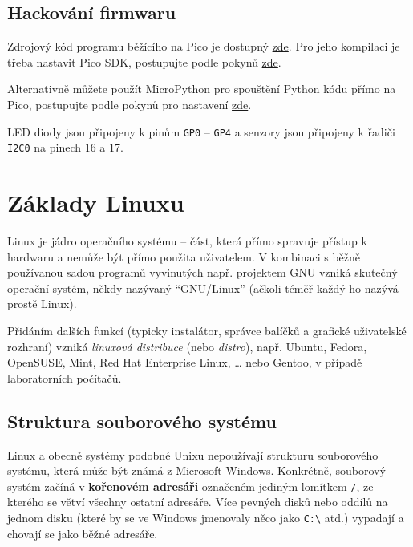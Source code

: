 \subsection{Hackování firmwaru}
Zdrojový kód programu běžícího na Pico je dostupný \href{https://bitbucket.org/emil_varga/picolab/src/master/}{zde}. Pro jeho kompilaci je třeba nastavit Pico SDK, postupujte podle pokynů \href{https://www.raspberrypi.com/documentation/microcontrollers/c_sdk.html}{zde}.

Alternativně můžete použít MicroPython pro spouštění Python kódu přímo na Pico, postupujte podle pokynů pro nastavení \href{https://www.raspberrypi.com/documentation/microcontrollers/micropython.html#what-is-micropython}{zde}.

LED diody jsou připojeny k pinům \verb|GP0| -- \verb|GP4| a senzory jsou připojeny k řadiči \verb|I2C0| na pinech 16 a 17.


\section{Základy Linuxu}

Linux je jádro operačního systému -- část, která přímo spravuje přístup k hardwaru a nemůže být přímo použita uživatelem. V kombinaci s běžně používanou sadou programů vyvinutých např. projektem GNU vzniká skutečný operační systém, někdy nazývaný
``GNU/Linux'' (ačkoli téměř každý ho nazývá prostě Linux).

Přidáním dalších funkcí (typicky instalátor, správce balíčků a grafické uživatelské rozhraní) vzniká \emph{linuxová distribuce} (nebo \emph{distro}), např. Ubuntu, Fedora, OpenSUSE, Mint, Red Hat Enterprise Linux, \ldots{} nebo Gentoo, v případě laboratorních počítačů.

\subsection{Struktura souborového systému}

Linux a obecně systémy podobné Unixu nepoužívají strukturu souborového systému, která může být známá z Microsoft Windows. Konkrétně, souborový systém začíná v \textbf{kořenovém adresáři} označeném jediným lomítkem \verb|/|, ze kterého se větví všechny ostatní adresáře. Více pevných disků nebo oddílů na jednom disku (které by se ve Windows jmenovaly něco jako \verb|C:\| atd.) vypadají a chovají se jako běžné adresáře.

